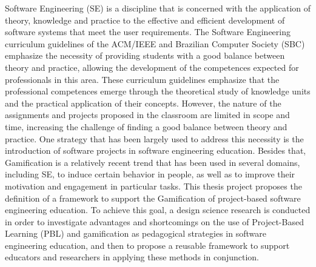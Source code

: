 Software Engineering (SE) is a discipline that is concerned with the application of theory, knowledge and practice to the effective and efficient development of software systems that meet the user requirements. The Software Engineering curriculum guidelines of the ACM/IEEE and Brazilian Computer Society (SBC) emphasize the necessity of providing students with a good balance between theory and practice, allowing the development of the competences expected for professionals in this area. These curriculum guidelines emphasize that the professional competences emerge through the theoretical study of knowledge units and the practical application of their concepts. However, the nature of the assignments and projects proposed in the classroom are limited in scope and time, increasing the challenge of finding a good balance between theory and practice. One strategy that has been largely used to address this necessity is the introduction of software projects in software engineering education. Besides that, Gamification is a relatively recent trend that has been used in several domains, including SE, to induce certain behavior in people, as well as to improve their motivation and engagement in particular tasks. This thesis project proposes the definition of a framework to support the Gamification of project-based software engineering education. To achieve this goal, a design science research is conducted in order to investigate advantages and shortcomings on the use of Project-Based Learning (PBL) and gamification as pedagogical strategies in software engineering education, and then to propose a reusable framework to support educators and researchers in applying these methods in conjunction. 


